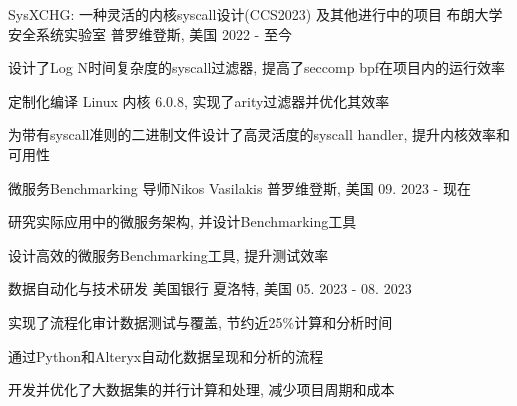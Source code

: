 \begin{cventries}
 
  \cventry
    {SysXCHG: 一种灵活的内核syscall设计(CCS2023) 及其他进行中的项目}
    {布朗大学安全系统实验室}
    {普罗维登斯, 美国}
    {2022 - 至今}
    {
      \begin{cvitems}
        \item {设计了Log N时间复杂度的syscall过滤器, 提高了seccomp bpf在项目内的运行效率}
        \item {定制化编译 Linux 内核 6.0.8, 实现了arity过滤器并优化其效率}
        \item {为带有syscall准则的二进制文件设计了高灵活度的syscall handler, 提升内核效率和可用性}      
      \end{cvitems}
    }

  \cventry
    {微服务Benchmarking}
    {导师Nikos Vasilakis}
    {普罗维登斯, 美国}
    {09. 2023 - 现在}
    {
      \begin{cvitems}
        \item {研究实际应用中的微服务架构, 并设计Benchmarking工具}
        \item {设计高效的微服务Benchmarking工具, 提升测试效率}
      \end{cvitems}
    }

  \cventry
    {数据自动化与技术研发}
    {美国银行}
    {夏洛特, 美国}
    {05. 2023 - 08. 2023}
    {
      \begin{cvitems}
        \item {实现了流程化审计数据测试与覆盖, 节约近25\%计算和分析时间}
        \item {通过Python和Alteryx自动化数据呈现和分析的流程}
        \item {开发并优化了大数据集的并行计算和处理, 减少项目周期和成本}
      \end{cvitems}
    }

  \begin{comment}
  \cventry
    {Machine Learning \& Computation}
    {Chemical Molecular Energy Optimization}
    {Providence, RI}
    {Aug 2022 - Present}
    {
      \begin{cvitems}
        \item {Analyzed traditional Hartree-Fock and DFT methods with Gaussian}
        \item {Implemented the original data pipeline on Brown's Oscar super computing cluster with 200x speed}
        \item {Working on an efficient Belief Propagation network based on HMC}
      \end{cvitems}
    }
  \end{comment}


\end{cventries}
